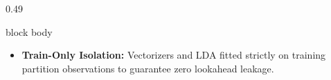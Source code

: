 \documentclass[aspectratio=169, 10pt]{beamer}
\newenvironment{card}[1][]{%
        \begin{beamercolorbox}[rounded=true,shadow=false,wd=\linewidth,sep=3.5pt,#1]{block body}%
        \fontsize{7.8pt}{9.8pt}\selectfont%
    }{%
        \end{beamercolorbox}%
    }
\begin{document}
\begin{frame}[t]
\begin{columns}[T]
\begin{column}{0.49\textwidth}
\begin{card}
\begin{itemize}
  tokens).                                                                                                                                                                                             
                        \item \textbf{Train-Only Isolation:} Vectorizers and LDA fitted strictly on training partition observations to guarantee zero lookahead leakage.                               
                    \end{itemize}                                                                                                                                                                      
                \end{card}                                                                                                                                                                             
            \end{column}                                                                                                                                                                               
                                                                                                                                                                                                       

\end{columns}
\end{frame}
\end{document}
